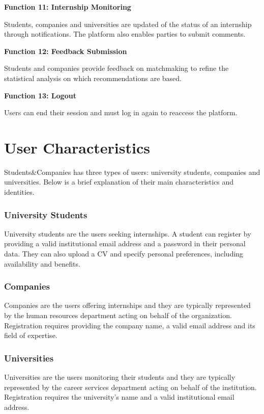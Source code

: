\textbf{\textcolor{polimiblue}{Function 11: Internship Monitoring}}

Students, companies and universities are updated of the status of an internship through notifications.
The platform also enables parties to submit comments.

\textbf{\textcolor{polimiblue}{Function 12: Feedback Submission}}

Students and companies provide feedback on matchmaking to refine the statistical analysis on which recommendations are based.

\textbf{\textcolor{polimiblue}{Function 13: Logout}}

Users can end their session and must log in again to reaccess the platform.

\section{User Characteristics}
Students\&Companies has three types of users: university students, companies and universities.
Below is a brief explanation of their main characteristics and identities.

\subsubsection{University Students}
University students are the users seeking internships.
A student can register by providing a valid institutional email address and a password in their personal data.
They can also upload a CV and specify personal preferences, including availability and benefits.

\subsubsection{Companies}
Companies are the users offering internships and they are typically represented by the human resources department acting on behalf of the organization.
Registration requires providing the company name, a valid email address and its field of expertise.

\subsubsection{Universities}
Universities are the users monitoring their students and they are typically represented by the career services department acting on behalf of the institution.
Registration requires the university's name and a valid institutional email address.

